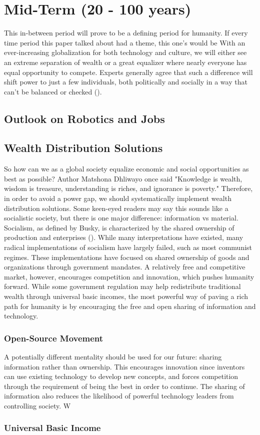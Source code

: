 \section{Mid-Term (20 - 100 years)}
\label{sec:mid}
This in-between period will prove to be a defining period for humanity. If every time period this paper talked about had a theme, this one's would be %
With an ever-increasing globalization for both technology and culture, we will either see an extreme separation of wealth or a great equalizer where nearly everyone has equal opportunity to compete. Experts generally agree that such a difference will shift power to just a few individuals, both politically and socially in a way that can't be balanced or checked (\cite{WhatsWrongWithWealthDistribution}).
\subsection{Outlook on Robotics and Jobs}

\subsection{Wealth Distribution Solutions}

So how can we as a global society equalize economic and social opportunities as best as possible? Author Matshona Dhliwayo once said "Knowledge is wealth, wisdom is treasure, understanding is riches, and ignorance is poverty." %
Therefore, in order to avoid a power gap, we should systematically implement wealth distribution solutions. Some keen-eyed readers may say this sounds like a socialistic society, but there is one major difference: information vs material. Socialism, as defined by Busky, is characterized by the shared ownership of production and enterprises (\cite{WhatIsSocialism}). While many interpretations have existed, many radical implementations of socialism have largely failed, such as most communist regimes. These implementations have focused on shared ownership of goods and organizations through government mandates. A relatively free and competitive market, however, encourages competition and innovation, which pushes humanity forward. While some government regulation may help redistribute traditional wealth through universal basic incomes, the most powerful way of paving a rich path for humanity is by encouraging the free and open sharing of information and technology.

\subsubsection{Open-Source Movement} \label{subsec:open-source}
A potentially different mentality should be used for our future: sharing information rather than ownership. This encourages innovation since inventors can use existing technology to develop new concepts, and forces competition through the requirement of being the best in order to continue. The sharing of information also reduces the likelihood of powerful technology leaders from controlling society. W

\subsubsection{Universal Basic Income}

